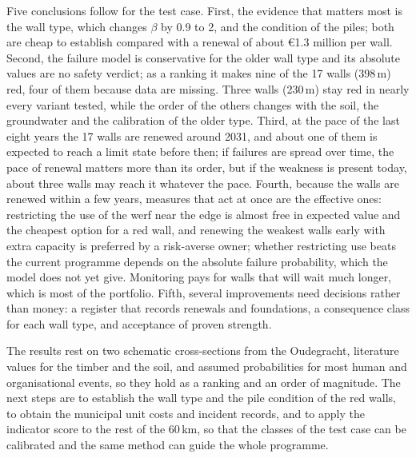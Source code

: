 Five conclusions follow for the test case. First, the evidence that matters
most is the wall type, which changes $\beta$ by 0.9 to 2, and the condition of
the piles; both are cheap to establish compared with a renewal of about
\euro1.3 million per wall. Second, the failure model is conservative for the
older wall type and its absolute values are no safety verdict; as a ranking it
makes nine of the 17 walls (398\,m) red, four of them because data are
missing. Three walls (230\,m) stay red in nearly every variant tested, while
the order of the others changes with the soil, the groundwater and the
calibration of the older type. Third, at the pace of the last eight
years the 17 walls are renewed around 2031, and about one of them is expected to
reach a limit state before then; if failures are spread over time, the pace of
renewal matters more than its order, but if the weakness is present today,
about three walls may reach it whatever the pace. Fourth, because the walls are renewed within a few years, measures that
act at once are the effective ones: restricting the use of the werf near the
edge is almost free in expected value and the cheapest option for a red wall,
and renewing the weakest walls early
with extra capacity is preferred by a risk-averse owner; whether restricting use beats the current programme
depends on the absolute failure probability, which the model does not yet give. Monitoring pays for walls that will wait much longer, which
is most of the portfolio. Fifth, several improvements need decisions rather
than money: a register that records renewals and foundations, a consequence
class for each wall type, and acceptance of proven strength.

The results rest on two schematic cross-sections from the Oudegracht, literature
values for the timber and the soil, and assumed probabilities for most human and
organisational events, so they hold as a ranking and an order of magnitude. The
next steps are to establish the wall type and the pile condition of the red
walls, to obtain the municipal unit costs and incident records, and to apply
the indicator score to the rest of the 60\,km, so that the classes of the test
case can be calibrated and the same method can guide the whole programme.

